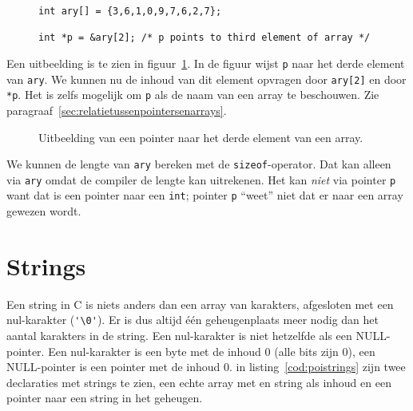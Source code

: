 \begin{figure}[!ht]
\begin{lstlisting}[caption=Een pointer naar het derde element van een array.,label=cod:poithirdarray]
int ary[] = {3,6,1,0,9,7,6,2,7};

int *p = &ary[2]; /* p points to third element of array */
\end{lstlisting}
\end{figure}

Een uitbeelding is te zien in figuur~\ref{fig:poithirdarray}. In de figuur wijst \texttt{p} naar het derde element van \texttt{ary}. We kunnen nu de inhoud van dit element opvragen door \texttt{ary[2]} en door \texttt{*p}. Het is zelfs mogelijk om \texttt{p} als de naam van een array te beschouwen. Zie paragraaf~\ref{sec:relatietussenpointersenarrays}.

\begin{figure}[!ht]
\centering
{}
\caption{Uitbeelding van een pointer naar het derde element van een array.}
\label{fig:poithirdarray}
\end{figure}

We kunnen de lengte van \texttt{ary} bereken met de \texttt{sizeof}-operator. Dat kan alleen via \texttt{ary} omdat de compiler de lengte kan uitrekenen. Het kan \textsl{niet} via pointer \texttt{p} want dat is een pointer naar een \texttt{int}; pointer \texttt{p} ``weet'' niet dat er naar een array gewezen wordt.


\section{Strings}
\label{sec:strings}
Een string in C is niets anders dan een array van karakters, afgesloten met een nul-karakter (\lstinline|'\0'|). Er is dus altijd één geheugenplaats meer nodig dan het aantal karakters in de string. Een nul-karakter is niet hetzelfde als een NULL-pointer. Een nul-karakter is een byte met de inhoud 0 (alle bits zijn 0), een NULL-pointer is een pointer met de inhoud 0. in listing~\ref{cod:poistrings} zijn twee declaraties met strings te zien, een echte array met en string als inhoud en een pointer naar een string in het geheugen.

